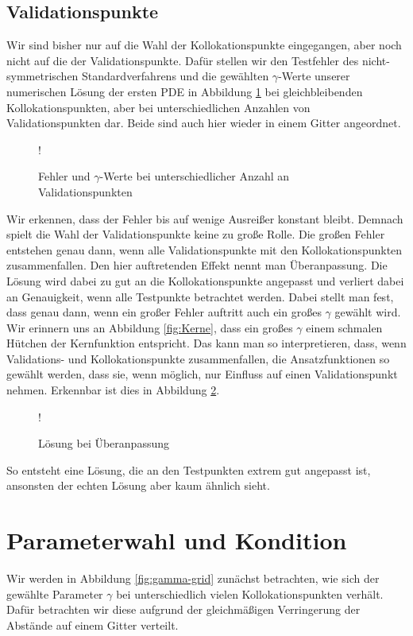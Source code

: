 \subsection{Validationspunkte}
Wir sind bisher nur auf die Wahl der Kollokationspunkte eingegangen, aber noch nicht auf die der Validationspunkte. Dafür stellen wir den Testfehler des nicht-symmetrischen Standardverfahrens und die gewählten $\gamma$-Werte unserer numerischen Lösung der ersten \ac{PDE} in Abbildung \ref{fig:testpunkte} bei gleichbleibenden Kollokationspunkten, aber bei unterschiedlichen Anzahlen von Validationspunkten dar. Beide sind auch hier wieder in einem Gitter angeordnet.
\begin{figure}[ht]
\centering
\resizebox {\columnwidth} {!} {

}
\caption{Fehler und $\gamma$-Werte bei unterschiedlicher Anzahl an Validationspunkten}
\label{fig:testpunkte}
\end{figure}
Wir erkennen, dass der Fehler bis auf wenige Ausreißer konstant bleibt. Demnach spielt die Wahl der Validationspunkte keine zu große Rolle. Die großen Fehler entstehen genau dann, wenn alle Validationspunkte mit den Kollokationspunkten zusammenfallen. Den hier auftretenden Effekt nennt man Überanpassung. Die Lösung wird dabei zu gut an die Kollokationspunkte angepasst und verliert dabei an Genauigkeit, wenn alle Testpunkte betrachtet werden. Dabei stellt man fest, dass genau dann, wenn ein großer Fehler auftritt auch ein großes $\gamma$ gewählt wird. Wir erinnern uns an Abbildung \ref{fig:Kerne}, dass ein großes $\gamma$ einem schmalen \glqq Hütchen\grqq{}  der Kernfunktion entspricht. Das kann man so interpretieren, dass, wenn Validations- und Kollokationspunkte zusammenfallen, die Ansatzfunktionen so gewählt werden, dass sie, wenn möglich, nur \glqq Einfluss \grqq{} auf einen Validationspunkt nehmen. Erkennbar ist dies in Abbildung \ref{fig:overfitting}.
\begin{figure}[ht]
\centering
\resizebox {\columnwidth} {!} {

}
\caption{Lösung bei Überanpassung}
\label{fig:overfitting}
\end{figure}
So entsteht eine Lösung, die an den Testpunkten extrem gut angepasst ist, ansonsten der echten Lösung aber kaum ähnlich sieht.

\section{Parameterwahl und Kondition}
Wir werden in Abbildung \ref{fig:gamma-grid} zunächst betrachten, wie sich der gewählte Parameter $\gamma$ bei unterschiedlich vielen Kollokationspunkten verhält. Dafür betrachten wir diese aufgrund der gleichmäßigen Verringerung der Abstände auf einem Gitter verteilt. 

